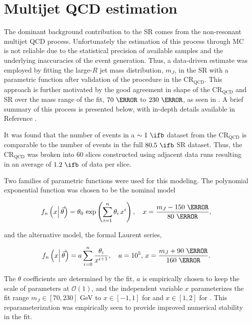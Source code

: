 \section{Multijet QCD estimation} \label{sec:background:qcd}

The dominant background contribution to the SR comes from the non-resonant
multijet QCD process. Unfortunately the estimation of this process through MC
is not reliable due to the statistical precision of available samples and the
underlying inaccuracies of the event generation.  Thus, a data-driven estimate
was employed by fitting the large-$R$ jet mass distribution, $m_{J}$, in the SR
with a parametric function after validation of the procedure in the
$\text{CR}_{\text{QCD}}$.  This approach is further motivated by the good
agreement in shape of the $\text{CR}_{\text{QCD}}$ and SR over the mass range
of the fit, $70~\GeV$ to $230~\GeV$, as seen in
. A brief summary of this process is presented
below, with in-depth details available in Reference \cite{Feickert:2690521}.

It was found that the number of events in a $\sim 1~\ifb$ dataset from the
$\text{CR}_{\text{QCD}}$ is comparable to the number of events in the full
$80.5~\ifb$ SR dataset.  Thus, the $\text{CR}_{\text{QCD}}$ was broken into 60
slices constructed using adjacent data runs resulting in an average of
$1.2~\ifb$ of data per slice.

Two families of parametric functions were used for this modeling.  The
polynomial exponential function was chosen to be the nominal model

\begin{equation}
\label{sec:background:polynomial}
f_{n} \left(x \middle|\,\vec{\theta}\right) = \theta_{0}\, \exp\left(\sum_{i=1}^{n} \theta_{i}\,x^{i}\right), \quad x = \frac{m_{J} - 150~\GeV}{80~\GeV},
\end{equation}

and the alternative model, the formal Laurent series,

\begin{equation}
\label{sec:background:laurent}
f_{n} \left(x \middle|\,\vec{\theta}\right) = a \sum_{i=0}^{n} \frac{\theta_{i}}{x^{i+1}}, \quad a=10^{5},\,x = \frac{m_{J} + 90~\GeV}{160~\GeV}.
\end{equation}

The $\theta$ coefficients are determined by the fit, $a$ is empirically chosen
to keep the scale of parameters at $\mathcal{O}(1)$, and the independent
variable $x$ parameterizes the fit range $m_{J}\in[70,230]$ GeV to $x\in[-1,1]$
for  and $x\in[1,2]$ for
.  This reparameterization was empirically seen to
provide improved numerical stability in the fit.

